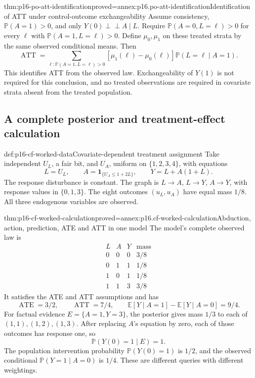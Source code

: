 \begin{hbtheorem}{thm:p16-po-att-identification}{proved=annex:p16.po-att-identification}{Identification of ATT under control-outcome exchangeability}
Assume consistency, \(\mathbb P(A=1)>0\), and only
\(Y(0)\mathrel{\perp\!\!\!\perp}A\mid L\).
Require \(\mathbb P(A=0,L=\ell)>0\) for every \(\ell\)
with \(\mathbb P(A=1,L=\ell)>0\). Define \(\mu_0,\mu_1\)
on these treated strata by the same observed conditional means. Then
\[
 \operatorname{ATT}
 =\sum_{\ell:\mathbb P(A=1,L=\ell)>0}
     [\mu_1(\ell)-\mu_0(\ell)]\mathbb P(L=\ell\mid A=1).
\]
This identifies ATT from the observed law. Exchangeability of \(Y(1)\)
is not required for this conclusion, and no treated observations are
required in covariate strata absent from the treated population.
\end{hbtheorem}

\subsection{A complete posterior and treatment-effect calculation}

\begin{hbdefinition}{def:p16-cf-worked-data}{Covariate-dependent treatment assignment}
Take independent \(U_L\), a fair bit, and \(U_A\), uniform on
\(\{1,2,3,4\}\), with equations
\[
 L=U_L,\qquad A=\mathbf1_{\{U_A\leq1+2L\}},\qquad
 Y=L+A(1+L).
\]
The response disturbance is constant. The graph is
\(L\to A\), \(L\to Y\), \(A\to Y\), with response values
in \(\{0,1,3\}\). The eight outcomes \((u_L,u_A)\) have
equal mass \(1/8\). All three endogenous variables are observed.
\end{hbdefinition}

\begin{hbtheorem}{thm:p16-cf-worked-calculation}{proved=annex:p16.cf-worked-calculation}{Abduction, action, prediction, ATE and ATT in one model}
The model's complete observed law is
\[
\begin{array}{ccc|c}
 L&A&Y&\text{mass}\\\hline
 0&0&0&3/8\\
 0&1&1&1/8\\
 1&0&1&1/8\\
 1&1&3&3/8
\end{array}
\]
It satisfies the ATE and ATT assumptions and has
\[
 \operatorname{ATE}=3/2,\qquad\operatorname{ATT}=7/4,
 \qquad\mathbb E[Y\mid A=1]-\mathbb E[Y\mid A=0]=9/4.
\]
For factual evidence \(E=\{A=1,Y=3\}\), the posterior gives
mass \(1/3\) to each of \((1,1),(1,2),(1,3)\).
After replacing \(A\)'s equation by zero, each of those outcomes
has response one, so
\[
 \mathbb P(Y(0)=1\mid E)=1.
\]
The population intervention probability \(\mathbb P(Y(0)=1)\)
is \(1/2\), and the observed conditional \(\mathbb P(Y=1\mid A=0)\)
is \(1/4\). These are different queries with different weightings.
\end{hbtheorem}

